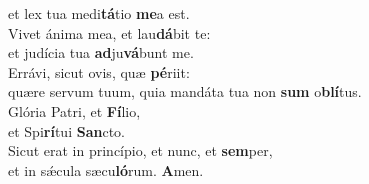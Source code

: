 \evenverse et lex tua medi\textbf{tá}tio \textbf{me}a est.\\
\oddverse Vivet ánima mea, et lau\textbf{dá}bit te:~\*\\
\oddverse et judícia tua \textbf{ad}ju\textbf{vá}bunt me.\\
\evenverse Errávi, sicut ovis, quæ \textbf{pé}riit:~\*\\
\evenverse quære servum tuum, quia mandáta tua non \textbf{sum} o\textbf{blí}tus.\\
\oddverse Glória Patri, et \textbf{Fí}lio,~\*\\
\oddverse et Spi\textbf{rí}tui \textbf{San}cto.\\
\evenverse Sicut erat in princípio, et nunc, et \textbf{sem}per,~\*\\
\evenverse et in sǽcula sæcu\textbf{ló}rum. \textbf{A}men.\\
